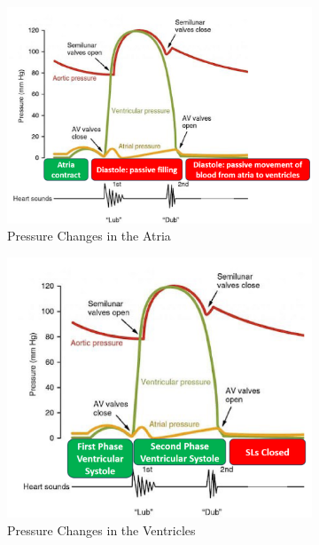 \documentclass[11pt,fleqn]{book}
\begin{document}
\begin{figure}[h!]
    \centering
    \begin{subfigure}{0.45\textwidth}
        \includegraphics[width=\textwidth]{Pictures/Screenshot 2024-04-04 003419.png}
        \caption{Pressure Changes in the Atria}
    \end{subfigure}
    \hfill
    \begin{subfigure}{0.45\textwidth}
        \includegraphics[width=\textwidth]{Pictures/Screenshot 2024-04-04 003425.png}
        \caption{Pressure Changes in the Ventricles}
    \end{subfigure}
    \begin{subfigure}{0.45\textwidth}

\end{subfigure}
\end{figure}
\end{document}
